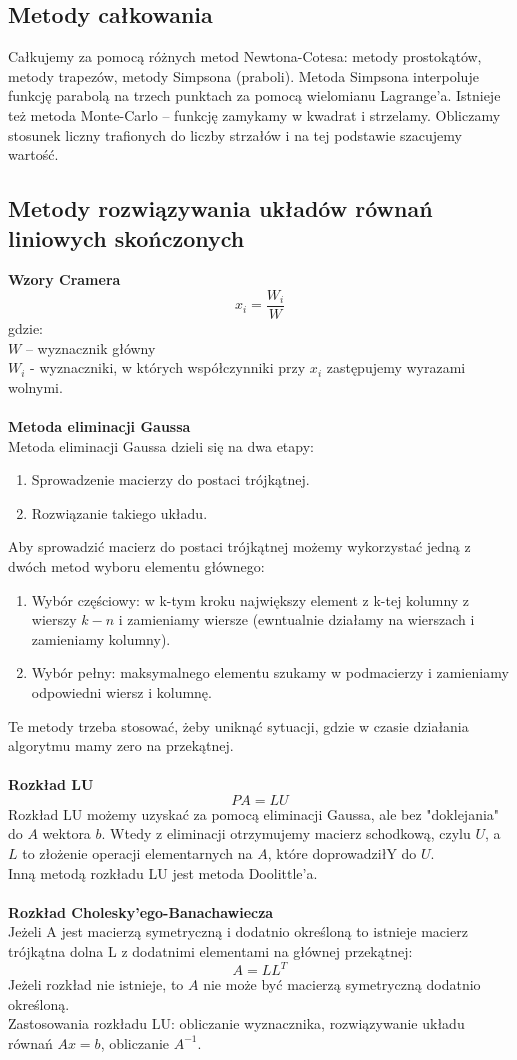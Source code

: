 \documentclass[12pt]{article}
\begin{document}
\subsection{Metody całkowania}
Całkujemy za pomocą różnych metod Newtona-Cotesa: metody prostokątów, metody trapezów, metody Simpsona (praboli). Metoda Simpsona interpoluje funkcję parabolą na trzech punktach za pomocą wielomianu Lagrange'a. Istnieje też metoda Monte-Carlo -- funkcję zamykamy w kwadrat i strzelamy. Obliczamy stosunek liczny trafionych do liczby strzałów i na tej podstawie szacujemy wartość.

\subsection{Metody rozwiązywania układów równań liniowych skończonych}
\textbf{Wzory Cramera}\\
$$x_{i} = \frac{W_{i}}{W}$$ gdzie:\\
$W$ -- wyznacznik główny\\
$W_{i}$ - wyznaczniki, w których współczynniki przy $x_{i}$ zastępujemy wyrazami wolnymi.\\
~\\
\textbf{Metoda eliminacji Gaussa}\\
Metoda eliminacji Gaussa dzieli się na dwa etapy:
\begin{enumerate}
	\item Sprowadzenie macierzy do postaci trójkątnej.
	\item Rozwiązanie takiego układu.
\end{enumerate}
Aby sprowadzić macierz do postaci trójkątnej możemy wykorzystać jedną z dwóch metod wyboru elementu głównego:
\begin{enumerate}
	\item Wybór częściowy: w k-tym kroku największy element z k-tej kolumny z wierszy $k-n$ i zamieniamy wiersze (ewntualnie działamy na wierszach i zamieniamy kolumny).
	\item Wybór pełny: maksymalnego elementu szukamy w podmacierzy i zamieniamy odpowiedni wiersz i kolumnę.
\end{enumerate}
Te metody trzeba stosować, żeby uniknąć sytuacji, gdzie w czasie działania algorytmu mamy zero na przekątnej.\\
~\\
\textbf{Rozkład LU}
$$PA = LU$$
Rozkład LU możemy uzyskać za pomocą eliminacji Gaussa, ale bez "doklejania" do $A$ wektora $b$. Wtedy z eliminacji otrzymujemy macierz schodkową, czylu $U$, a $L$ to złożenie operacji elementarnych na $A$, które doprowadziłY do $U$.\\
Inną metodą rozkładu LU jest metoda Doolittle'a.\\
~\\
\textbf{Rozkład Cholesky'ego-Banachawiecza}\\
Jeżeli A jest macierzą symetryczną i dodatnio określoną to istnieje macierz trójkątna dolna L z dodatnimi elementami na głównej przekątnej:
$$A = LL^{T}$$
Jeżeli rozkład nie istnieje, to $A$ nie może być macierzą symetryczną dodatnio określoną.\\
Zastosowania rozkładu LU: obliczanie wyznacznika, rozwiązywanie układu równań $Ax = b$, obliczanie $A^{-1}$.
\end{document}
